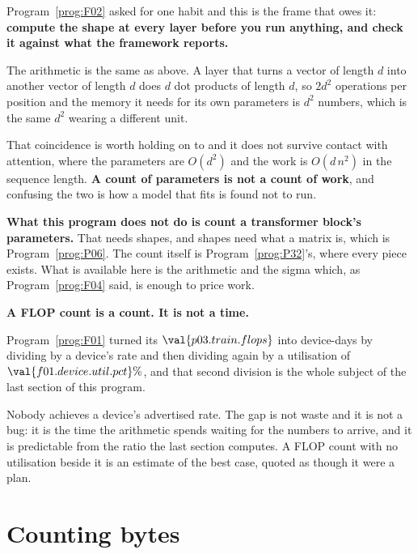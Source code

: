 \begin{fr}
Program~\ref{prog:F02} asked for one habit and this is the frame that owes it:
\textbf{compute the shape at every layer before you run anything, and check it
against what the framework reports.}

The arithmetic is the same as above. A layer that turns a vector of length $d$
into another vector of length $d$ does $d$ dot products of length $d$, so
$2d^{2}$ operations per position \dash{} and the memory it needs for its own
parameters is $d^{2}$ numbers, which is the same $d^{2}$ wearing a different
unit.

That coincidence is worth holding on to and it does not survive contact with
attention, where the parameters are $O(d^{2})$ and the work is
$O(d\,n^{2})$ in the sequence length. \textbf{A count of parameters is not a count of
work}, and confusing the two is how a model that fits is found not to run.

\begin{rigourbox}
\textbf{What this program does not do is count a transformer block's
parameters.} That needs shapes, and shapes need what a matrix is, which is
Program~\ref{prog:P06}. The count itself is Program~\ref{prog:P32}'s, where
every piece exists. What is available here is the arithmetic and the sigma
\dash{} which, as Program~\ref{prog:F04} said, is enough to price work.
\end{rigourbox}
\end{fr}

\begin{fr}
\begin{trapbox}
\textbf{A FLOP count is a count. It is not a time.}

Program~\ref{prog:F01} turned its $\val{p03.train.flops}$ into device-days by
dividing by a device's rate and then dividing again by a utilisation of
$\val{f01.device.util.pct}\%$, and that second division is the whole subject of
the last section of this program.

Nobody achieves a device's advertised rate. The gap is not waste and it is not
a bug: it is the time the arithmetic spends waiting for the numbers to arrive,
and it is predictable from the ratio the last section computes. A FLOP count
with no utilisation beside it is an estimate of the best case, quoted as though
it were a plan.
\end{trapbox}
\end{fr}

\section{Counting bytes}
\label{sec:P03-bytes}

